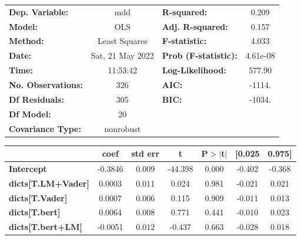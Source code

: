 \begin{center}
\begin{tabular}{lclc}
\toprule
\textbf{Dep. Variable:}              &       mdd        & \textbf{  R-squared:         } &     0.209   \\
\textbf{Model:}                      &       OLS        & \textbf{  Adj. R-squared:    } &     0.157   \\
\textbf{Method:}                     &  Least Squares   & \textbf{  F-statistic:       } &     4.033   \\
\textbf{Date:}                       & Sat, 21 May 2022 & \textbf{  Prob (F-statistic):} &  4.61e-08   \\
\textbf{Time:}                       &     11:53:42     & \textbf{  Log-Likelihood:    } &    577.90   \\
\textbf{No. Observations:}           &         326      & \textbf{  AIC:               } &    -1114.   \\
\textbf{Df Residuals:}               &         305      & \textbf{  BIC:               } &    -1034.   \\
\textbf{Df Model:}                   &          20      & \textbf{                     } &             \\
\textbf{Covariance Type:}            &    nonrobust     & \textbf{                     } &             \\
\bottomrule
\end{tabular}
\begin{tabular}{lcccccc}
                                     & \textbf{coef} & \textbf{std err} & \textbf{t} & \textbf{P$> |$t$|$} & \textbf{[0.025} & \textbf{0.975]}  \\
\midrule
\textbf{Intercept}                   &      -0.3846  &        0.009     &   -44.398  &         0.000        &       -0.402    &       -0.368     \\
\textbf{dicts[T.LM+Vader]}           &       0.0003  &        0.011     &     0.024  &         0.981        &       -0.021    &        0.021     \\
\textbf{dicts[T.Vader]}              &       0.0007  &        0.006     &     0.115  &         0.909        &       -0.011    &        0.013     \\
\textbf{dicts[T.bert]}               &       0.0064  &        0.008     &     0.771  &         0.441        &       -0.010    &        0.023     \\
\textbf{dicts[T.bert+LM]}            &      -0.0051  &        0.012     &    -0.437  &         0.663        &       -0.028    &        0.018     \\

\end{tabular}
\end{center}

